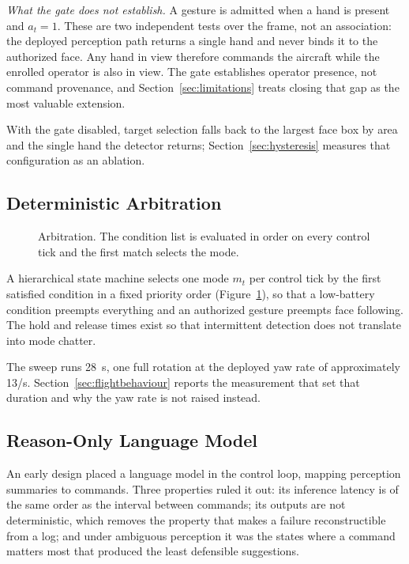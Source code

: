 \documentclass[conference]{IEEEtran}
\begin{document}
\textit{What the gate does not establish.} A gesture is admitted when a hand is
present and $a_t=1$. These are two independent tests over the frame, not an
association: the deployed perception path returns a single hand and never binds
it to the authorized face. Any hand in view therefore commands the aircraft
while the enrolled operator is also in view. The gate establishes operator
presence, not command provenance, and Section~\ref{sec:limitations} treats
closing that gap as the most valuable extension.

With the gate disabled, target selection falls back to the largest face box by
area and the single hand the detector returns; Section~\ref{sec:hysteresis}
measures that configuration as an ablation.

\subsection{Deterministic Arbitration}
\label{sec:arb}

\begin{figure}[t]
\centering
\resizebox{0.95\columnwidth}{!}{}
\caption{Arbitration. The condition list is evaluated in order on every control
tick and the first match selects the mode.}
\label{fig:hfsm}
\end{figure}

A hierarchical state machine selects one mode $m_t$ per control tick by the
first satisfied condition in a fixed priority order (Figure~\ref{fig:hfsm}), so
that a low-battery condition preempts everything and an authorized gesture
preempts face following. The hold and release times exist so that intermittent
detection does not translate into mode chatter.

The sweep runs 28~s, one full rotation at the deployed yaw rate of
approximately 13\textdegree/s. Section~\ref{sec:flightbehaviour} reports the
measurement that set that duration and why the yaw rate is not raised instead.

\subsection{Reason-Only Language Model}
\label{sec:reasondesign}

An early design placed a language model in the control loop, mapping perception
summaries to commands. Three properties ruled it out: its inference latency is
of the same order as the interval between commands; its outputs are not
deterministic, which removes the property that makes a failure reconstructible
from a log; and under ambiguous perception it was the states where a command
matters most that produced the least defensible suggestions.
\end{document}
